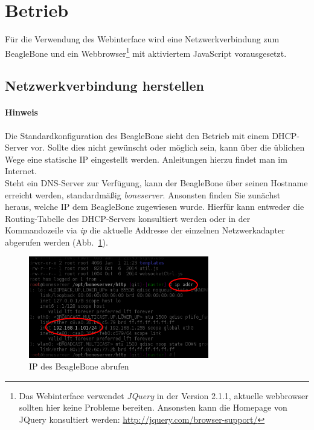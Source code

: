 \documentclass[manual.tex]{subfiles}
\begin{document}
\section{Betrieb}
Für die Verwendung des Webinterface wird eine Netzwerkverbindung zum BeagleBone und ein Webbrowser\footnote{Das Webinterface verwendet \emph{JQuery} in der Version 2.1.1, aktuelle webbrowser sollten hier keine Probleme bereiten. Ansonsten kann die Homepage von JQuery konsultiert werden: \url{http://jquery.com/browser-support/}} mit aktiviertem JavaScript vorausgesetzt.


\subsection{Netzwerkverbindung herstellen}

\paragraph{Hinweis} Die Standardkonfiguration des BeagleBone sieht den Betrieb mit einem DHCP-Server vor. Sollte dies nicht gewünscht oder möglich sein, kann über die üblichen Wege eine statische IP eingestellt werden. Anleitungen hierzu findet man im Internet.\\

Steht ein DNS-Server zur Verfügung, kann der BeagleBone über seinen Hostname erreicht werden, standardmäßig \textit{boneserver}. Ansonsten finden Sie zunächst heraus, welche IP dem BeagleBone zugewiesen wurde. Hierfür kann entweder die Routing-Tabelle des DHCP-Servers konsultiert werden oder in der Kommandozeile via \emph{ip} die aktuelle Addresse der einzelnen Netzwerkadapter abgerufen werden \mbox{(Abb. \ref{fig:getBeagleBoneIP})}.

\begin{figure}[ht]
	\centering
	\includegraphics[width=0.7\textwidth]{images/manual/getBeagleBoneIP.png}
	\caption{IP des BeagleBone abrufen}
	\label{fig:getBeagleBoneIP}
\end{figure}
\end{document}
